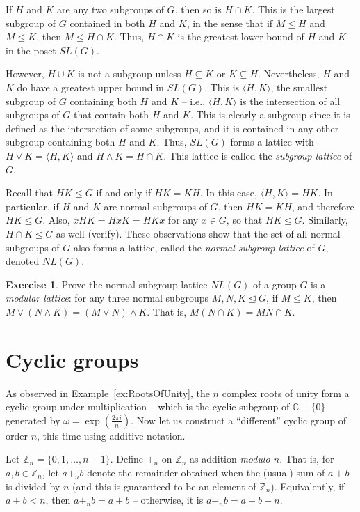 \documentclass[svgnames]{article}
\theoremstyle{definition}
\newtheorem{Exercise}{Exercise}[section]
\theoremstyle{remark}
\begin{document}
\begin{appendices}
If $H$ and $K$ are any two subgroups of $G$, then so is $H \cap K$. This is the largest subgroup of $G$ contained in both $H$ and $K$, in the sense that if $M \le H$ and $M \le K$, then $M \le H \cap K$. Thus, $H \cap K$ is the greatest lower bound of $H$ and $K$ in the poset $SL(G)$.

\label{def:Join} However, $H \cup K$ is not a subgroup unless $H \subseteq K$ or $K \subseteq H$. Nevertheless, $H$ and $K$ do have a greatest upper bound in $SL(G)$. This is $\langle H, K \rangle$, the smallest subgroup of $G$ containing both $H$ and $K$ -- i.e., $\langle H, K \rangle$ is the intersection of all subgroups of $G$ that contain both $H$ and $K$. This is clearly a subgroup since it is defined as the intersection of some subgroups, and it is contained in any other subgroup containing both $H$ and $K$. Thus, $SL(G)$ forms a lattice with $H \vee K = \langle H, K \rangle$ and $H \wedge K = H \cap K$. This lattice is called the \emph{subgroup lattice} of $G$.

\label{def:NL(G)}Recall that $HK \le G$ if and only if $HK = KH$. In this case, $\langle H, K \rangle = HK$. In particular, if $H$ and $K$ are normal subgroups of $G$, then $HK = KH$, and therefore $HK \le G$. Also, $xHK = HxK = HKx$ for any $x \in G$, so that $HK \unlhd G$. Similarly, $H \cap K \unlhd G$ as well {\small (verify)}. These observations show that the set of all normal subgroups of $G$ also forms a lattice, called the \emph{normal subgroup lattice} of $G$, denoted $NL(G)$.
\begin{Exercise}
Prove the normal subgroup lattice $NL(G)$ of a group $G$ is a \emph{modular lattice}: for any three normal subgroups $M, N, K \unlhd G$, if $M \le K$, then $M \vee (N \wedge K) = (M \vee N) \wedge K$. That is, $M(N \cap K) = MN \cap K$.
\end{Exercise}

\section{Cyclic groups}\label{sec:CycGroups}
As observed in Example~\ref{ex:RootsOfUnity}, the $n$ complex roots of unity form a cyclic group under multiplication -- which is the cyclic subgroup of $\mathbb C - \{0\}$ generated by $\omega = \exp(\frac{2\pi i}{n})$. Now let us construct a ``different'' cyclic group of order $n$, this time using additive notation.

\label{def:Zn} Let $\mathbb Z_n = \{0, 1, \ldots, n - 1\}$. Define $+_n$ on $\mathbb Z_n$ as addition \emph{modulo $n$}. That is, for $a, b \in \mathbb Z_n$, let $a +_n b$ denote the remainder obtained when the (usual) sum of $a + b$ is divided by $n$ (and this is guaranteed to be an element of $\mathbb Z_n$). Equivalently, if $a + b < n$, then $a +_n b = a + b$  -- otherwise, it is $a +_n b = a + b - n$.


\end{appendices}
\end{document}
